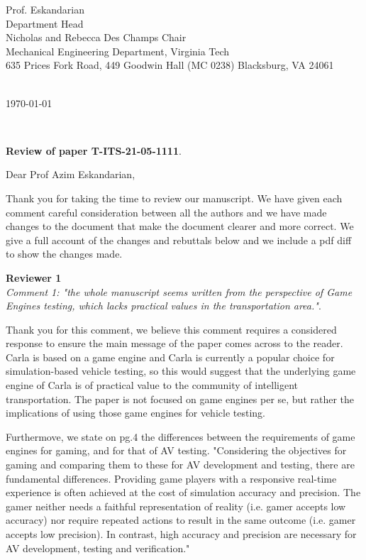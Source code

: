 \documentclass[11pt, a4paper]{letter} %
\renewcommand{\opening}[1]{
	{\centering\fromaddress\vspace{0.05\textheight} \\ %
	\hspace*{\longindentation}\today\hspace*{\fill}\par} %
	{\raggedright \toname \\ \toaddress \par} %
	\vspace{1cm} %
	\noindent #1 %
}
\begin{document}

\begin{letter}{
	Prof. Eskandarian\\
	Department Head\\ 
	Nicholas and Rebecca Des Champs Chair\\
	Mechanical Engineering Department, Virginia Tech\\
	635 Prices Fork Road, 449 Goodwin Hall (MC 0238)
	Blacksburg, VA 24061
}


\opening{}


\textbf{Review of paper T-ITS-21-05-1111}.

Dear Prof Azim Eskandarian,

Thank you for taking the time to review our manuscript. We have given each comment careful consideration between all the authors and we have made changes to the document that make the document clearer and more correct. We give a full account of the changes and rebuttals below and we include a pdf diff to show the changes made.

\textbf{Reviewer 1}\\
\textit{Comment 1: "the whole manuscript seems written from the perspective of Game Engines testing, which lacks practical values in the transportation area."}.

Thank you for this comment, we believe this comment requires a considered response to ensure the main message of the paper comes across to the reader. Carla is based on a game engine and Carla is currently a popular choice for simulation-based vehicle testing, so this would suggest that the underlying  game engine of Carla is of practical value to the community of intelligent transportation. The paper is not focused on game engines per se, but rather the implications of using those game engines for vehicle testing. 

Furthermove, we state on pg.4 the differences between the requirements of game engines for gaming, and for that of AV testing. "Considering the objectives for gaming and comparing them to these for AV development and testing, there are fundamental differences. Providing game players with a responsive real-time experience is often achieved at the cost of simulation accuracy and precision. The gamer neither needs a faithful representation of reality (i.e. gamer accepts low accuracy) nor require repeated actions to result in the same outcome (i.e. gamer accepts low precision). In contrast, high accuracy and precision are necessary for AV development, testing and verification." 


\end{letter}
\end{document}

